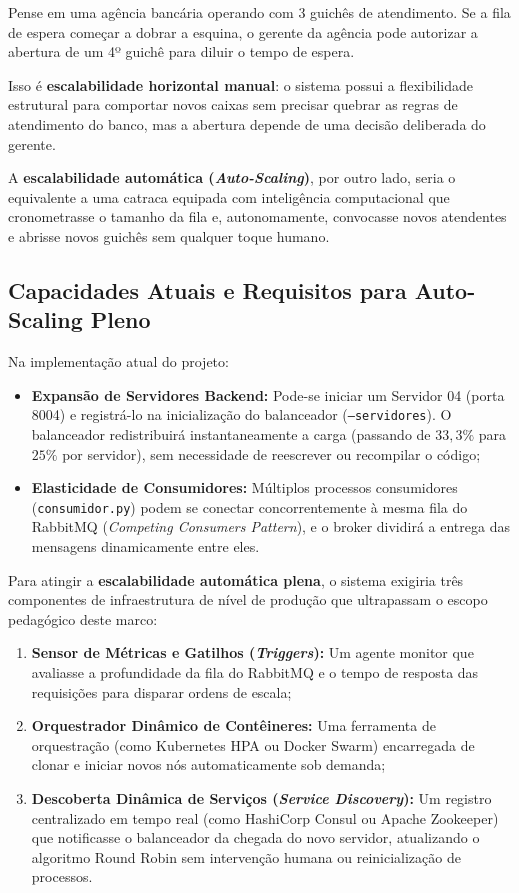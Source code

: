 \documentclass[11pt,a4paper]{article}
\begin{document}
\begin{analogia}
Pense em uma agência bancária operando com 3 guichês de atendimento. Se a fila de espera começar a dobrar a esquina, o gerente da agência pode autorizar a abertura de um 4º guichê para diluir o tempo de espera. 

Isso é \textbf{escalabilidade horizontal manual}: o sistema possui a flexibilidade estrutural para comportar novos caixas sem precisar quebrar as regras de atendimento do banco, mas a abertura depende de uma decisão deliberada do gerente. 

A \textbf{escalabilidade automática (\textit{Auto-Scaling})}, por outro lado, seria o equivalente a uma catraca equipada com inteligência computacional que cronometrasse o tamanho da fila e, autonomamente, convocasse novos atendentes e abrisse novos guichês sem qualquer toque humano.
\end{analogia}

\subsection{Capacidades Atuais e Requisitos para Auto-Scaling Pleno}

Na implementação atual do projeto:
\begin{itemize}
    \item \textbf{Expansão de Servidores Backend:} Pode-se iniciar um Servidor 04 (porta 8004) e registrá-lo na inicialização do balanceador (\texttt{--servidores}). O balanceador redistribuirá instantaneamente a carga (passando de $33{,}3\%$ para $25\%$ por servidor), sem necessidade de reescrever ou recompilar o código;
    \item \textbf{Elasticidade de Consumidores:} Múltiplos processos consumidores (\texttt{consumidor.py}) podem se conectar concorrentemente à mesma fila do RabbitMQ (\textit{Competing Consumers Pattern}), e o broker dividirá a entrega das mensagens dinamicamente entre eles.
\end{itemize}

Para atingir a \textbf{escalabilidade automática plena}, o sistema exigiria três componentes de infraestrutura de nível de produção que ultrapassam o escopo pedagógico deste marco:
\begin{enumerate}
    \item \textbf{Sensor de Métricas e Gatilhos (\textit{Triggers}):} Um agente monitor que avaliasse a profundidade da fila do RabbitMQ e o tempo de resposta das requisições para disparar ordens de escala;
    \item \textbf{Orquestrador Dinâmico de Contêineres:} Uma ferramenta de orquestração (como Kubernetes HPA ou Docker Swarm) encarregada de clonar e iniciar novos nós automaticamente sob demanda;
    \item \textbf{Descoberta Dinâmica de Serviços (\textit{Service Discovery}):} Um registro centralizado em tempo real (como HashiCorp Consul ou Apache Zookeeper) que notificasse o balanceador da chegada do novo servidor, atualizando o algoritmo Round Robin sem intervenção humana ou reinicialização de processos.
\end{enumerate}
\end{document}
